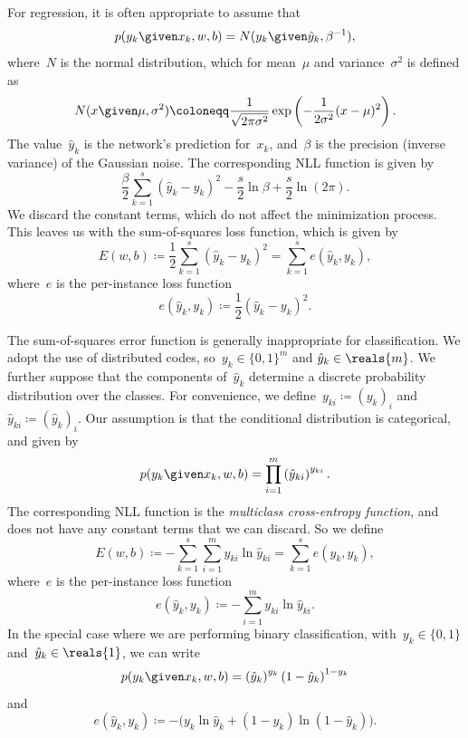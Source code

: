 \documentclass[11pt,a4paper]{article}
\numberwithin{equation}{section}
\begin{document}
For regression, it is often appropriate to assume that
\[
	p(y_k \given x_k, w, b) = N(y_k \given \hat{y}_k, \beta^{-1}),
\]
where~$N$ is the normal distribution, which for mean~$\mu$ and
variance~$\sigma^2$ is defined as
\[
	N(x \given \mu, \sigma^2) \coloneqq \frac{1}{\sqrt{2 \pi \sigma^2}}
		\exp\left( -\frac{1}{2 \sigma^2} (x - \mu)^2 \right).
\]
The value~$\hat{y}_k$ is the network's prediction for~$x_k$, and~$\beta$ is the
precision (inverse variance) of the Gaussian noise. The corresponding NLL
function is given by
\[
	\frac{\beta}{2} \sum_{k = 1}^s \left(\hat{y}_k - y_k\right)^2 -
		\frac{s}{2} \ln\beta + \frac{s}{2} \ln(2 \pi).
\]
We discard the constant terms, which do not affect the minimization process.
This leaves us with the sum-of-squares loss function, which is given by
\begin{equation}
	E(w, b)
	\coloneqq \frac{1}{2} \sum_{k = 1}^s \left(\hat{y}_k - y_k\right)^2
	= \sum_{k = 1}^s e(\hat{y}_k, y_k),
	\label{eq:sum_of_squares}
\end{equation}
where~$e$ is the per-instance loss function
\[
	e(\hat{y}_k, y_k) \coloneqq \frac{1}{2} \left(\hat{y}_k - y_k\right)^2.
\]

The sum-of-squares error function is generally inappropriate for classification.
We adopt the use of distributed codes, so~$y_k \in \{0, 1\}^m$ and $\hat{y}_k
\in \reals{m}$. We further suppose that the components of~$\hat{y}_k$ determine
a discrete probability distribution over the classes. For convenience, we
define~$y_{ki} \coloneqq (y_k)_i$ and~$\hat{y}_{ki} \coloneqq (\hat{y}_k)_i$.
Our assumption is that the conditional distribution is categorical, and given by
\[
	p(y_k \given x_k, w, b) = \prod_{i = 1}^m \left(\hat{y}_{ki}\right)^{y_{ki}}.
\]
The corresponding NLL function is the \emph{multiclass cross-entropy function},
and does not have any constant terms that we can discard. So we define
\[
	E(w, b)
	\coloneqq -\sum_{k = 1}^s \sum_{i = 1}^m y_{ki} \ln\hat{y}_{ki}
	= \sum_{k = 1}^s e(\hat{y}_k, y_k),
\]
where~$e$ is the per-instance loss function
\[
	e(\hat{y}_k, y_k) \coloneqq -\sum_{i = 1}^m y_{ki} \ln\hat{y}_{ki}.
\]
In the special case where we are performing binary classification, with~$y_k \in
\{0, 1\}$ and~$\hat{y}_k \in \reals{1}$, we can write
\[
	p(y_k \given x_k, w, b) = \left(\hat{y}_k\right)^{y_k}
		\left(1 - \hat{y}_k\right)^{1 - y_k}
\]
and
\[
	e(\hat{y}_k, y_k) \coloneqq -\big(
		y_k \ln\hat{y}_k + (1 - y_k) \ln(1 - \hat{y}_k) \big).
\]
\end{document}
